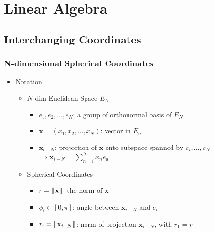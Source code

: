 \section{Linear Algebra}

\subsection{Interchanging Coordinates}

\subsubsection{N-dimensional Spherical Coordinates}
\begin{itemize}
\item Notation
	\begin{itemize}
	\item $N$-dim Euclidean Space $E_N$
		\begin{itemize}
		\item $e_1, e_2,...,e_N$: a group of orthonormal basis of $E_N$
		\item $\mathbf x = (x_1, x_2,...,x_N)$: vector in $E_n$
		\item $\mathbf x_{i-N}$: projection of $\mathbf x$ onto subspace spanned by $e_i,...,e_N$ \\
			$\displaystyle \Rightarrow \mathbf x_{i-N} = \sum_{n=i}^N x_ne_n$
		\end{itemize}
	\item Spherical Coordinates
		\begin{itemize}
		\item $r=\lVert\mathbf x\rVert$: the norm of $\mathbf x$
		\item $\phi_i \in [0,\pi]$: angle between $\mathbf x_{i-N}$ and $e_i$
		\item $r_i=\lVert\mathbf x_{i-N}\rVert$: norm of projection $\mathbf x_{i-N}$, with $r_1 = r$
		\end{itemize}
	\end{itemize}
	

\end{itemize}
